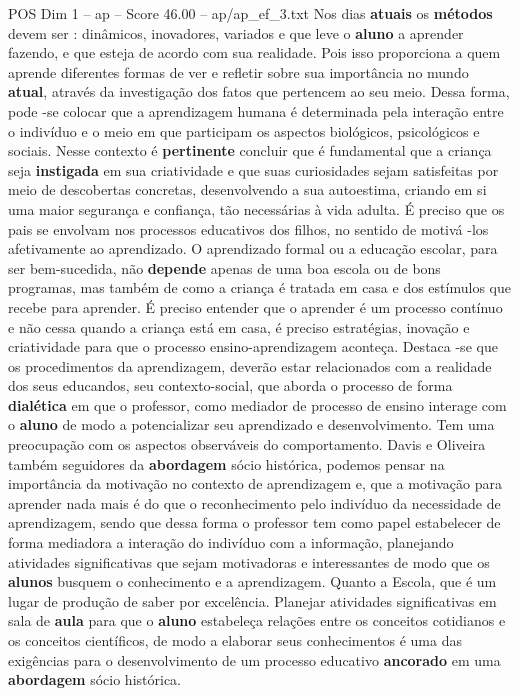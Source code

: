 \begin{textsample}{POS Dim 1 – ap – Score 46.00 – ap/ap\_ef\_3.txt}
Nos dias \textbf{atuais} os \textbf{métodos} devem ser : dinâmicos, inovadores, variados e que leve o \textbf{aluno} a aprender fazendo, e que esteja de acordo com sua realidade.
Pois isso proporciona a quem aprende diferentes formas de ver e refletir sobre sua importância no mundo \textbf{atual}, através da investigação dos fatos que pertencem ao seu meio.
Dessa forma, pode -se colocar que a aprendizagem humana é determinada pela interação entre o indivíduo e o meio em que participam os aspectos biológicos, psicológicos e sociais.
Nesse contexto é \textbf{pertinente} concluir que é fundamental que a criança seja \textbf{instigada} em sua criatividade e que suas curiosidades sejam satisfeitas por meio de descobertas concretas, desenvolvendo a sua autoestima, criando em si uma maior segurança e confiança, tão necessárias à vida adulta.
É preciso que os pais se envolvam nos processos educativos dos filhos, no sentido de motivá -los afetivamente ao aprendizado.
O aprendizado formal ou a educação escolar, para ser bem-sucedida, não \textbf{depende} apenas de uma boa escola ou de bons programas, mas também de como a criança é tratada em casa e dos estímulos que recebe para aprender.
É preciso entender que o aprender é um processo contínuo e não cessa quando a criança está em casa, é preciso estratégias, inovação e criatividade para que o processo ensino-aprendizagem aconteça.
Destaca -se que os procedimentos da aprendizagem, deverão estar relacionados com a realidade dos seus educandos, seu contexto-social, que aborda o processo de forma \textbf{dialética} em que o professor, como mediador de processo de ensino interage com o \textbf{aluno} de modo a potencializar seu aprendizado e desenvolvimento.
Tem uma preocupação com os aspectos observáveis do comportamento.
Davis e Oliveira também seguidores da \textbf{abordagem} sócio histórica, podemos pensar na importância da motivação no contexto de aprendizagem e, que a motivação para aprender nada mais é do que o reconhecimento pelo indivíduo da necessidade de aprendizagem, sendo que dessa forma o professor tem como papel estabelecer de forma mediadora a interação do indivíduo com a informação, planejando atividades significativas que sejam motivadoras e interessantes de modo que os \textbf{alunos} busquem o conhecimento e a aprendizagem.
Quanto a Escola, que é um lugar de produção de saber por excelência.
Planejar atividades significativas em sala de \textbf{aula} para que o \textbf{aluno} estabeleça relações entre os conceitos cotidianos e os conceitos científicos, de modo a elaborar seus conhecimentos é uma das exigências para o desenvolvimento de um processo educativo \textbf{ancorado} em uma \textbf{abordagem} sócio histórica.

\end{textsample}
